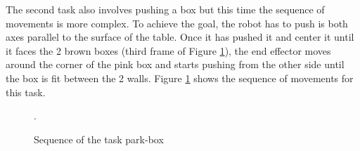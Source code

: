 The second task also involves pushing a box but this time the sequence of movements is more complex. To achieve the goal, the robot has to push is both axes parallel to the surface of the table. Once it has pushed it and center it until it faces the 2 brown boxes (third frame of Figure \ref{fig:sequence-park-box}), the end effector moves around the corner of the pink box and starts pushing from the other side until the box is fit between the 2 walls. Figure \ref{fig:sequence-park-box} shows the sequence of movements for this task.


 \begin{figure}[H]
  \centering
   \hfill
   \hfill
   \hfill
   \hfill
   \hfill
  \caption{Sequence of the task park-box}.
  \label{fig:sequence-park-box}
\end{figure}

